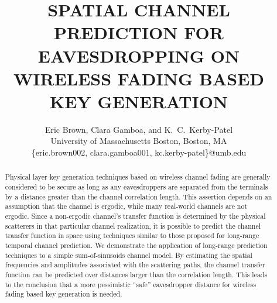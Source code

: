 \documentclass{allertonproc}
\title{SPATIAL CHANNEL PREDICTION FOR EAVESDROPPING ON WIRELESS FADING BASED KEY GENERATION}
\date{}
\author{Eric Brown, Clara Gamboa, and K.~C.~Kerby-Patel\\University of Massachusetts Boston, Boston, MA\\ \{eric.brown002, clara.gamboa001, kc.kerby-patel\}@umb.edu}
\begin{document}
\maketitle
\begin{abstract}

Physical layer key generation techniques based on wireless channel fading are generally considered to be secure as long as any eavesdroppers are separated from the terminals by a distance greater than the channel correlation length.  This assertion depends on an assumption that the channel is ergodic, while many real-world channels are not ergodic.  Since a non-ergodic channel's transfer function is determined by the physical scatterers in that particular channel realization, it is possible to predict the channel transfer function in space using techniques similar to those proposed for long-range temporal channel prediction.  We demonstrate the application of long-range prediction techniques to a simple sum-of-sinusoids channel model.  By estimating the spatial frequencies and amplitudes associated with the scattering paths, the channel transfer function can be predicted over distances larger than the correlation length.  This leads to the conclusion that a more pessimistic ``safe'' eavesdropper distance for wireless fading based key generation is needed.
\end{abstract}
\end{document}
